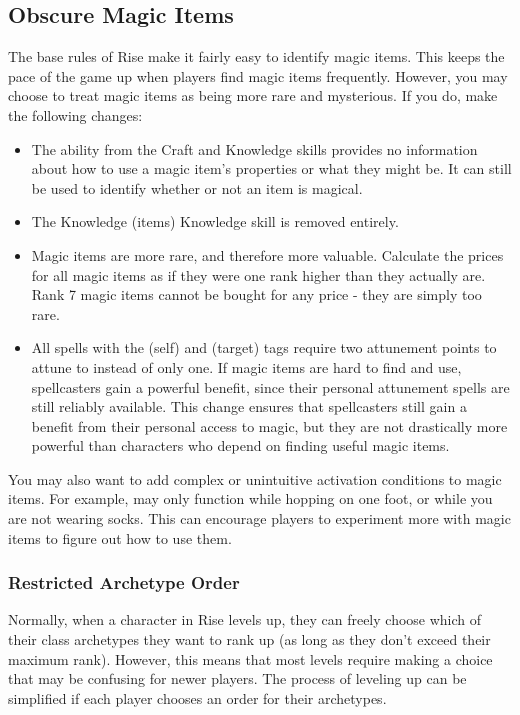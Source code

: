    \subsection{Obscure Magic Items}\label{Obscure Magic Items}
        The base rules of Rise make it fairly easy to identify magic items.
        This keeps the pace of the game up when players find magic items frequently.
        However, you may choose to treat magic items as being more rare and mysterious.
        If you do, make the following changes:
        \begin{itemize}
            \item The  ability from the Craft and Knowledge skills provides no information about how to use a magic item's properties or what they might be.
                It can still be used to identify whether or not an item is magical.
            \item The Knowledge (items) Knowledge skill is removed entirely.
            \item Magic items are more rare, and therefore more valuable.
                Calculate the prices for all magic items as if they were one rank higher than they actually are.
                Rank 7 magic items cannot be bought for any price - they are simply too rare.
            \item All spells with the  (self) and  (target) tags require two attunement points to attune to instead of only one.
                If magic items are hard to find and use, spellcasters gain a powerful benefit, since their personal attunement spells are still reliably available.
                This change ensures that spellcasters still gain a benefit from their personal access to magic, but they are not drastically more powerful than characters who depend on finding useful magic items.
        \end{itemize}

        You may also want to add complex or unintuitive activation conditions to magic items.
        For example,  may only function while hopping on one foot, or while you are not wearing socks.
        This can encourage players to experiment more with magic items to figure out how to use them.

    \subsubsection{Restricted Archetype Order}
        Normally, when a character in Rise levels up, they can freely choose which of their class archetypes they want to rank up (as long as they don't exceed their maximum rank).
        However, this means that most levels require making a choice that may be confusing for newer players.
        The process of leveling up can be simplified if each player chooses an order for their archetypes.

